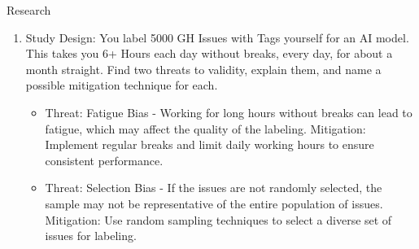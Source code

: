 \documentclass{article}
\begin{document}
\begin{exercise}{Research}
\begin{enumerate}
    \item Study Design: You label 5000 GH Issues with Tags yourself for an AI model. This takes you 6+ Hours each day without breaks, every day, for about a month straight. Find two threats to validity, explain them, and name a possible mitigation technique for each. \begin{solution}
        \begin{itemize}
          \item Threat: Fatigue Bias - Working for long hours without breaks can lead to fatigue, which may affect the quality of the labeling. Mitigation: Implement regular breaks and limit daily working hours to ensure consistent performance.
          \item Threat: Selection Bias - If the issues are not randomly selected, the sample may not be representative of the entire population of issues. Mitigation: Use random sampling techniques to select a diverse set of issues for labeling.
        \end{itemize}
      \end{solution}
  \end{enumerate}
\end{exercise}
\end{document}

